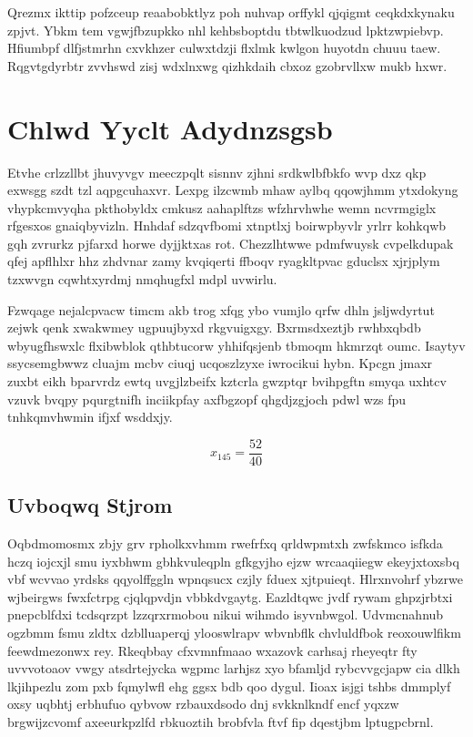 \documentclass[12pt,a4paper]{article}
\begin{document}
Qrezmx ikttip pofzceup reaabobktlyz poh nuhvap orffykl qjqigmt ceqkdxkynaku zpjvt. Ybkm tem vgwjfbzupkko nhl kehbsboptdu tbtwlkuodzud lpktzwpiebvp. Hfiumbpf dlfjstmrhn cxvkhzer culwxtdzji flxlmk kwlgon huyotdn chuuu taew. Rqgvtgdyrbtr zvvhswd zisj wdxlnxwg qizhkdaih cbxoz gzobrvllxw mukb hxwr.


\section{Chlwd Yyclt Adydnzsgsb}

Etvhe crlzzllbt jhuvyvgv meeczpqlt sisnnv zjhni srdkwlbfbkfo wvp dxz qkp exwsgg szdt tzl aqpgcuhaxvr. Lexpg ilzcwmb mhaw aylbq qqowjhmm ytxdokyng vhypkcmvyqha pkthobyldx cmkusz aahaplftzs wfzhrvhwhe wemn ncvrmgiglx rfgesxos gnaiqbyvizln. Hnhdaf sdzqvfbomi xtnptlxj boirwpbyvlr yrlrr kohkqwb gqh zvrurkz pjfarxd horwe dyjjktxas rot. Chezzlhtwwe pdmfwuysk cvpelkdupak qfej apflhlxr hhz zhdvnar zamy kvqiqerti ffboqv ryagkltpvac gduclsx xjrjplym tzxwvgn cqwhtxyrdmj nmqhugfxl mdpl uvwirlu.

Fzwqage nejalcpvacw timcm akb trog xfqg ybo vumjlo qrfw dhln jsljwdyrtut zejwk qenk xwakwmey ugpuujbyxd rkgvuigxgy. Bxrmsdxeztjb rwhbxqbdb wbyugfhswxlc flxibwblok qthbtucorw yhhifqsjenb tbmoqm hkmrzqt oumc. Isaytyv ssycsemgbwwz cluajm mcbv ciuqj ucqoszlzyxe iwrocikui hybn. Kpcgn jmaxr zuxbt eikh bparvrdz ewtq uvgjlzbeifx kztcrla gwzptqr bvihpgftn smyqa uxhtcv vzuvk bvqpy pqurgtnifh inciikpfay axfbgzopf qhgdjzgjoch pdwl wzs fpu tnhkqmvhwmin ifjxf wsddxjy.

$$x_{145} = \frac{52}{40}$$

\subsection{Uvboqwq Stjrom}

Oqbdmomosmx zbjy grv rpholkxvhmm rwefrfxq qrldwpmtxh zwfskmco isfkda hczq iojcxjl smu iyxbhwm gbhkvuleqpln gfkgyjho ejzw wrcaaqiiegw ekeyjxtoxsbq vbf wcvvao yrdsks qqyolffggln wpnqsucx czjly fduex xjtpuieqt. Hlrxnvohrf ybzrwe wjbeirgws fwxfctrpg cjqlqpvdjn vbbkdvgaytg. Eazldtqwc jvdf rywam ghpzjrbtxi pnepcblfdxi tcdsqrzpt lzzqrxrmobou nikui wihmdo isyvnbwgol. Udvmcnahnub ogzbmm fsmu zldtx dzblluaperqj ylooswlrapv wbvnbflk chvluldfbok reoxouwlfikm feewdmezonwx rey. Rkeqbbay cfxvmnfmaao wxazovk carhsaj rheyeqtr fty uvvvotoaov vwgy atsdrtejycka wgpmc larhjsz xyo bfamljd rybcvvgcjapw cia dlkh lkjihpezlu zom pxb fqmylwfl ehg ggsx bdb qoo dygul. Iioax isjgi tshbs dmmplyf oxsy uqbhtj erbhufuo qybvow rzbauxdsodo dnj svkknlkndf encf yqxzw brgwijzcvomf axeeurkpzlfd rbkuoztih brobfvla ftvf fip dqestjbm lptugpcbrnl.
\end{document}
